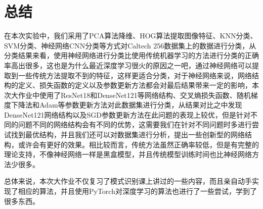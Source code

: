 \documentclass[cn]{elegantbook}
\begin{document}
\section{总结}
在本次实验中，我们采用了PCA算法降维、HOG算法提取图像特征、KNN分类、SVM分类、神经网络CNN分类等方式对Caltech 256数据集上的数据进行分类，从分类结果来看，使用神经网络进行分类比使用传统机器学习的方法进行分类的正确率高出很多，这也是为什么最近深度学习很火的原因之一吧，通过神经网络可以提取到一些传统方法提取不到的特征，这样更适合分类，对于神经网络来说，网络结构的定义、损失函数的定义以及参数更新方法都会对最后结果带来一定的影响，本次大作业中使用了ResNet18和DenseNet121等网络结构、交叉熵损失函数、随机梯度下降法和Adam等参数更新方法对此数据集进行分类，从结果对比之中发现DenseNet121网络结构以及SGD参数更新方法在此问题的表现上较优，但是针对不同的问题不同的网络结构会有不同的优势，这需要我们在针对不同问题时多进行尝试找到最优结构，并且我们还可以对数据集进行分析，提出一些创新型的网络结构，或许会有更好的效果。相比较而言，传统方法虽然正确率较低，但是有完整的理论支持，不像神经网络一样是黑盒模型，并且传统模型训练时间也比神经网络方法少很多。

总体来说，本次大作业不仅复习了模式识别课上讲过的一些内容，而且亲自动手实现了相应的算法，并且使用PyTorch对深度学习的算法也进行了一些尝试，学到了很多东西。
\end{document}

